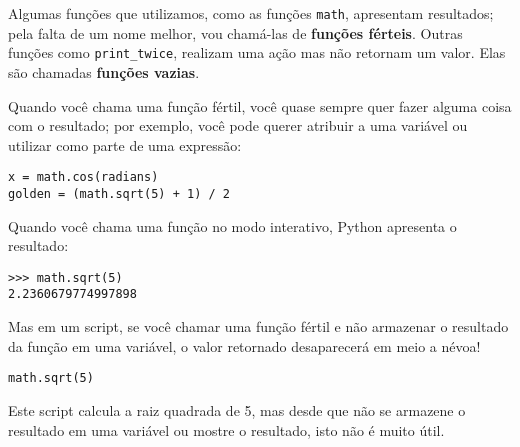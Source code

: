 
Algumas funções que utilizamos, como as funções {\tt math}, apresentam
resultados; pela falta de um nome melhor, vou chamá-las de
{\bf funções férteis}. Outras funções como \verb"print_twice", realizam
uma ação mas não retornam um valor. Elas são chamadas {\bf funções vazias}.


Quando você chama uma função fértil, você quase sempre quer fazer alguma
coisa com o resultado; por exemplo, você pode querer atribuir a uma variável
ou utilizar como parte de uma expressão:

\beforeverb
\begin{verbatim}
x = math.cos(radians)
golden = (math.sqrt(5) + 1) / 2
\end{verbatim}
\afterverb
%

%
Quando você chama uma função no modo interativo, Python apresenta o resultado:

\beforeverb
\begin{verbatim}
>>> math.sqrt(5)
2.2360679774997898
\end{verbatim}
\afterverb
%

Mas em um script, se você chamar uma função fértil e não armazenar o
resultado da função em uma variável, o valor retornado desaparecerá
em meio a névoa!

\beforeverb
\begin{verbatim}
math.sqrt(5)
\end{verbatim}
\afterverb
%

%
Este script calcula a raiz quadrada de 5, mas desde que não se armazene o
resultado em uma variável ou mostre o resultado, isto não é muito útil.

